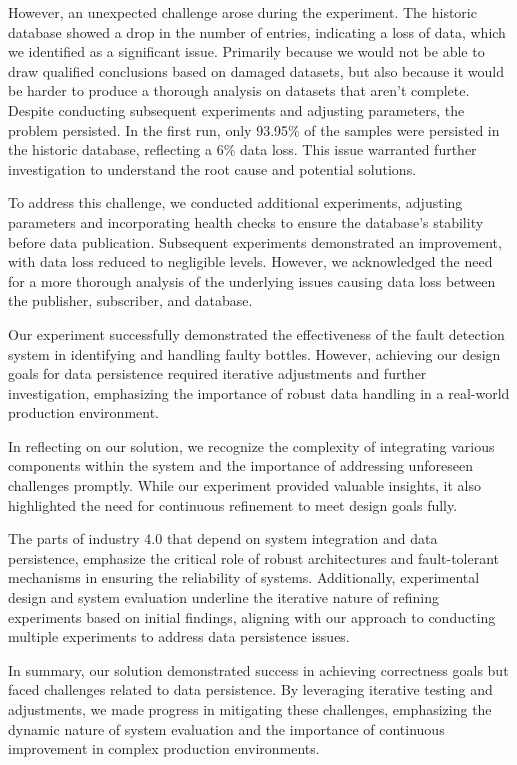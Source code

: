 \documentclass[conference]{IEEEtran}
\begin{document}
However, an unexpected challenge arose during the experiment. The historic database showed a drop in the number of entries, indicating a loss of data, which we identified as a significant issue. Primarily because we would not be able to draw qualified conclusions based on damaged datasets, but also because it would be harder to produce a thorough analysis on datasets that aren't complete. Despite conducting subsequent experiments and adjusting parameters, the problem persisted. In the first run, only 93.95\% of the samples were persisted in the historic database, reflecting a 6\% data loss. This issue warranted further investigation to understand the root cause and potential solutions.

To address this challenge, we conducted additional experiments, adjusting parameters and incorporating health checks to ensure the database's stability before data publication. Subsequent experiments demonstrated an improvement, with data loss reduced to negligible levels. However, we acknowledged the need for a more thorough analysis of the underlying issues causing data loss between the publisher, subscriber, and database.

Our experiment successfully demonstrated the effectiveness of the fault detection system in identifying and handling faulty bottles. However, achieving our design goals for data persistence required iterative adjustments and further investigation, emphasizing the importance of robust data handling in a real-world production environment.

In reflecting on our solution, we recognize the complexity of integrating various components within the system and the importance of addressing unforeseen challenges promptly. While our experiment provided valuable insights, it also highlighted the need for continuous refinement to meet design goals fully.

The parts of industry 4.0 that depend on system integration and data persistence, emphasize the critical role of robust architectures and fault-tolerant mechanisms in ensuring the reliability of systems. Additionally, experimental design and system evaluation underline the iterative nature of refining experiments based on initial findings, aligning with our approach to conducting multiple experiments to address data persistence issues.

In summary, our solution demonstrated success in achieving correctness goals but faced challenges related to data persistence. By leveraging iterative testing and adjustments, we made progress in mitigating these challenges, emphasizing the dynamic nature of system evaluation and the importance of continuous improvement in complex production environments.
\end{document}

